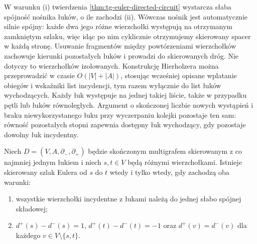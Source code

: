 \begin{uwaga}
W warunku (i) twierdzenia
\ref{thm:tg-euler-directed-circuit} wystarcza słaba
spójność nośnika łuków, o ile zachodzi (ii).
Wówczas nośnik jest automatycznie silnie spójny:
każde dwa jego różne wierzchołki występują
na otrzymanym zamkniętym szlaku, więc idąc
po nim cyklicznie otrzymujemy skierowany spacer
w każdą stronę. Usuwanie fragmentów między
powtórzeniami wierzchołków zachowuje kierunki
pozostałych łuków i prowadzi do skierowanych dróg.
Nie dotyczy to wierzchołków izolowanych.
Konstrukcję Hierholzera można przeprowadzić
w czasie $O(|V|+|A|)$, stosując wcześniej opisane
wplatanie obiegów i wskaźniki list incydencji,
tym razem wyłącznie do list łuków wychodzących.
Każdy łuk występuje na jednej takiej liście,
także w przypadku pętli lub łuków równoległych.
Argument o skończonej liczbie nowych wystąpień
i braku niewykorzystanego łuku przy wyczerpaniu
kolejki pozostaje ten sam: równość pozostałych
stopni zapewnia dostępny łuk wychodzący,
gdy pozostaje dowolny łuk incydentny.
\end{uwaga}

\begin{twierdzenie}
\label{thm:tg-euler-directed-trail}
Niech $D=(V,A,\partial_-,\partial_+)$ będzie skończonym
multigrafem skierowanym z co najmniej jednym łukiem
i niech $s,t\in V$ będą różnymi wierzchołkami.
Istnieje skierowany szlak Eulera od $s$ do $t$
wtedy i tylko wtedy, gdy zachodzą oba warunki:
\begin{enumerate}[label=(\roman*)]
\item wszystkie wierzchołki incydentne z łukami należą
do jednej słabo spójnej składowej;
\item $d^+(s)-d^-(s)=1$, $d^+(t)-d^-(t)=-1$ oraz
$d^+(v)=d^-(v)$ dla każdego $v\in V\setminus\{s,t\}$.
\end{enumerate}
\end{twierdzenie}

